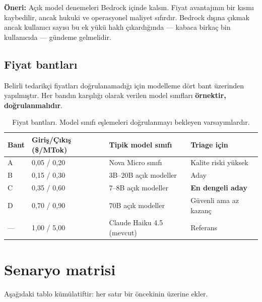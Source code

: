 \documentclass[11pt,a4paper]{article}
\newenvironment{keybox}
  {\begin{center}\begin{lrbox}{\kbox}\begin{minipage}{0.90\textwidth}\color{ink}\small}
  {\end{minipage}\end{lrbox}\setlength{\fboxsep}{11pt}\colorbox{soft}{\usebox{\kbox}}\end{center}}
\begin{document}
\begin{keybox}
\textbf{Öneri:} Açık model denemeleri Bedrock içinde kalsın. Fiyat avantajının bir kısmı
kaybedilir, ancak hukuki ve operasyonel maliyet sıfırdır. Bedrock dışına çıkmak ancak
kullanıcı sayısı bu ek yükü haklı çıkardığında --- kabaca birkaç bin kullanıcıda ---
gündeme gelmelidir.
\end{keybox}

\subsection{Fiyat bantları}

Belirli tedarikçi fiyatları doğrulanamadığı için modelleme dört bant üzerinden yapılmıştır.
Her bandın karşılığı olarak verilen model sınıfları \textbf{örnektir, doğrulanmalıdır}.

\begin{table}[h]
\centering\small
\begin{tabular}{@{}llll@{}}
\toprule
\textbf{Bant} & \textbf{Giriş/Çıkış (\$/MTok)} & \textbf{Tipik model sınıfı} & \textbf{Triage için} \\
\midrule
A & 0{,}05 / 0{,}20 & Nova Micro sınıfı & Kalite riski yüksek \\
B & 0{,}15 / 0{,}30 & 3B--20B açık modeller & Aday \\
C & 0{,}35 / 0{,}60 & 7--8B açık modeller & \textbf{En dengeli aday} \\
D & 0{,}70 / 0{,}90 & 70B açık modeller & Güvenli ama az kazanç \\
\midrule
--- & 1{,}00 / 5{,}00 & Claude Haiku 4.5 (mevcut) & Referans \\
\bottomrule
\end{tabular}
\caption{Fiyat bantları. Model sınıfı eşlemeleri doğrulanmayı bekleyen varsayımlardır.}
\end{table}

\section{Senaryo matrisi}

Aşağıdaki tablo kümülatiftir: her satır bir öncekinin üzerine ekler.

\begin{table}[h]
\centering\small
\renewcommand{\arraystretch}{1.2}

\caption{Kümülatif senaryo matrisi. Hafif = 20 mail + 3 sohbet/gün; Orta = 50 + 8;
Yoğun = 120 + 20.}
\end{table}
\end{document}
